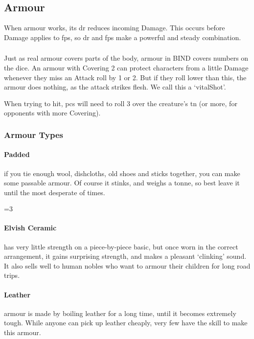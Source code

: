 \begin{multicols}{2}
\subsection{Armour}



When armour works, its \gls{dr} reduces incoming Damage.
This occurs before Damage applies to \glspl{fp}, so \gls{dr} and \glspl{fp} make a powerful and steady combination.

\subsubsection{}
\label{vitals}
Just as real armour covers parts of the body, armour in BIND covers numbers on the dice.
An armour with Covering 2 can protect characters from a little Damage whenever they miss an Attack roll by 1 or 2.
But if they roll lower than this, the armour does nothing, as the attack strikes flesh.
We call this a `\gls{vitalShot}'.

When trying to hit, \glspl{pc} will need to roll 3 over the creature's \gls{tn} (or more, for opponents with more Covering).

\armourchart

\noindent
\subsubsection{Armour Types}

\paragraph{Padded}
if you tie enough wool, dishcloths, old shoes and sticks together, you can make some passable armour.
Of course it stinks, and weighs a tonne, so best leave it until the most desperate of times.

\ifnum\value{r4}=3
  \paragraph{Elvish Ceramic}
  has very little strength on a piece-by-piece basic, but once worn in the correct arrangement, it gains surprising strength, and makes a pleasant `clinking' sound.
  It also sells well to human nobles who want to armour their children for long road trips. 
\fi

\paragraph{Leather}
armour is made by boiling leather for a long time, until it becomes extremely tough.
While anyone can pick up leather cheaply, very few have the skill to make this armour.


\end{multicols}
